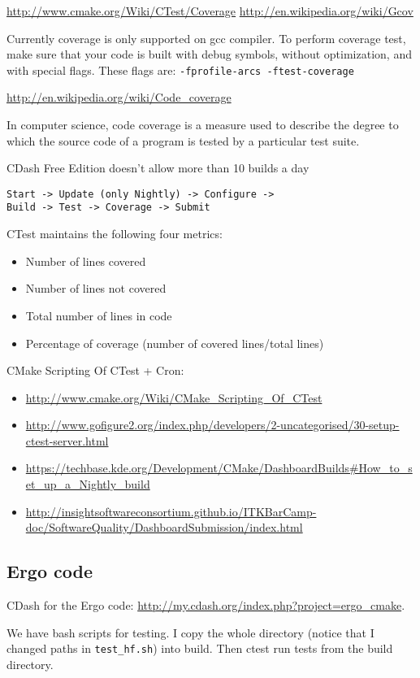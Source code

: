 \documentclass[a4paper,10pt]{article}
\begin{document}
\url{http://www.cmake.org/Wiki/CTest/Coverage}
\url{http://en.wikipedia.org/wiki/Gcov}

Currently coverage is only supported on gcc compiler. To perform coverage test, make sure that your code is built with debug symbols, without optimization, and with special flags. These flags are:
\texttt{-fprofile-arcs -ftest-coverage}

\url{http://en.wikipedia.org/wiki/Code_coverage}

In computer science, code coverage is a measure used to describe the degree to which the source code of a program is tested by a particular test suite. 

CDash Free Edition doesn't allow more than 10 builds a day

\begin{verbatim}
Start -> Update (only Nightly) -> Configure -> 
Build -> Test -> Coverage -> Submit
\end{verbatim}

CTest maintains the following four metrics:
\begin{itemize}
\item Number of lines covered
\item Number of lines not covered
\item Total number of lines in code
\item Percentage of coverage (number of covered lines/total lines)
\end{itemize}

CMake Scripting Of CTest + Cron:
\begin{itemize}
 \item \url{http://www.cmake.org/Wiki/CMake_Scripting_Of_CTest}
\item\url{http://www.gofigure2.org/index.php/developers/2-uncategorised/30-setup-ctest-server.html}
\item\url{https://techbase.kde.org/Development/CMake/DashboardBuilds#How_to_set_up_a_Nightly_build}
\item\url{http://insightsoftwareconsortium.github.io/ITKBarCamp-doc/SoftwareQuality/DashboardSubmission/index.html}
\end{itemize}

\subsection{Ergo code}

CDash for the Ergo code: \url{http://my.cdash.org/index.php?project=ergo_cmake}.

We have bash scripts for testing. I copy the whole directory (notice that I changed paths in \texttt{test\_hf.sh}) into build. Then ctest run tests from the build directory.
\end{document}
